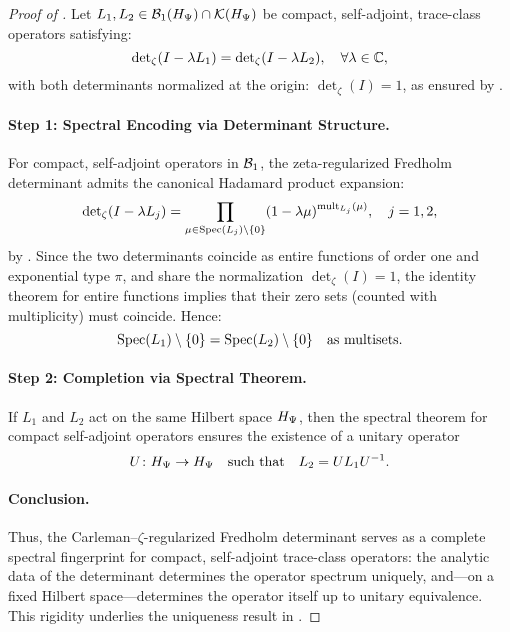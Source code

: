 \begin{proof}[Proof of ]
Let \( L_1, L_2 \in \mathcal{B}_1(H_{\Psi}) \cap \mathcal{K}(H_{\Psi}) \) be compact, self-adjoint, trace-class operators satisfying:
\[
\det\nolimits_\zeta(I - \lambda L_1) = \det\nolimits_\zeta(I - \lambda L_2), \quad \forall \lambda \in \mathbb{C},
\]
with both determinants normalized at the origin: \( \det\nolimits_\zeta(I) = 1 \), as ensured by .

\paragraph{Step 1: Spectral Encoding via Determinant Structure.}
For compact, self-adjoint operators in \( \mathcal{B}_1 \), the zeta-regularized Fredholm determinant admits the canonical Hadamard product expansion:
\[
\det\nolimits_\zeta(I - \lambda L_j) = \prod_{\mu \in \operatorname{Spec}(L_j) \setminus \{0\}} (1 - \lambda \mu)^{\operatorname{mult}_{L_j}(\mu)},
\quad j = 1,2,
\]
by . Since the two determinants coincide as entire functions of order one and exponential type \( \pi \), and share the normalization \( \det\nolimits_\zeta(I) = 1 \), the identity theorem for entire functions implies that their zero sets (counted with multiplicity) must coincide. Hence:
\[
\operatorname{Spec}(L_1) \setminus \{0\} = \operatorname{Spec}(L_2) \setminus \{0\}
\quad \text{as multisets}.
\]

\paragraph{Step 2: Completion via Spectral Theorem.}
If \( L_1 \) and \( L_2 \) act on the same Hilbert space \( H_{\Psi} \), then the spectral theorem for compact self-adjoint operators ensures the existence of a unitary operator
\[
U \colon H_{\Psi} \to H_{\Psi}
\quad \text{such that} \quad
L_2 = U L_1 U^{-1}.
\]

\paragraph{Conclusion.}
Thus, the Carleman–\(\zeta\)-regularized Fredholm determinant serves as a complete spectral fingerprint for compact, self-adjoint trace-class operators: the analytic data of the determinant determines the operator spectrum uniquely, and—on a fixed Hilbert space—determines the operator itself up to unitary equivalence. This rigidity underlies the uniqueness result in .
\end{proof}
